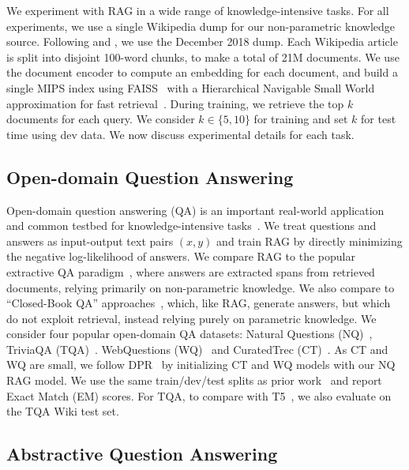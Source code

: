We experiment with RAG in a wide range of knowledge-intensive tasks. For all experiments, we use a single Wikipedia dump for our non-parametric knowledge source. Following \citet{lee-etal-2019-latent} and \citet{Karpukhin20dense}, we use the December 2018 dump. Each Wikipedia article is split into disjoint 100-word chunks, to make a total of 21M documents.
%
We use the document encoder to compute an embedding for each document, and build a single MIPS index using FAISS~\cite{JDH17} with a Hierarchical Navigable Small World approximation for fast retrieval~\cite{Malkov2016EfficientAR}.
% 
During training, we retrieve the top $k$ documents for each query. We consider $k \in \{5,10\}$ for training and set $k$ for test time using dev data. We now discuss experimental details for each task.

\subsection{Open-domain Question Answering}

Open-domain question answering (QA) is an important real-world application and common testbed for knowledge-intensive tasks~\cite{guu2020realm}. 
We treat questions and answers as input-output text pairs $(x,y)$ and train RAG by directly minimizing the negative log-likelihood of answers. 
We compare RAG to the popular extractive QA paradigm~\cite{chen_reading_2017,clark_simple_2017,lee-etal-2019-latent,Karpukhin20dense}, where answers are extracted spans from retrieved documents, relying primarily on non-parametric knowledge.
We also compare to ``Closed-Book QA'' approaches~\cite{roberts2020t5cqba}, which, like RAG, generate answers, but which do not exploit retrieval, instead relying purely on parametric knowledge.
We consider four popular open-domain QA datasets: Natural Questions (NQ)~\cite{kwiatkowski_natural_2019}, TriviaQA (TQA)~\cite{joshi_triviaqa:_2017}. WebQuestions (WQ)~\cite{berant_semantic_2013} and CuratedTrec (CT)~\cite{baudivs2015modeling}.
% 
As CT and WQ are small, we follow DPR~\cite{Karpukhin20dense} by initializing CT and WQ models with our NQ RAG model.
We use the same train/dev/test splits as prior work~\cite{lee-etal-2019-latent,Karpukhin20dense} 
% 
and report Exact Match (EM) scores. 
For TQA, to compare with T5~\cite{roberts2020t5cqba}, we also evaluate on the TQA Wiki test set.



\subsection{Abstractive Question Answering}

